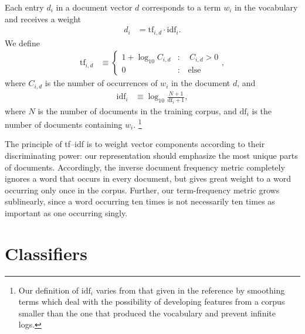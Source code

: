 \documentclass{article}
\begin{document}
Each entry $d_i$ in a document vector $d$ corresponds to a term $w_i$ in the vocabulary and receives a weight
%
\begin{align}
  d_i &= \mathrm{tf}_{i,d} \cdot \mathrm{idf}_{i}.
\end{align}
%
We define
%
\begin{align}
  \mathrm{tf}_{i,d} &\equiv \begin{cases}
                         1 + \log_{10}C_{i,d} &:\quad C_{i,d} > 0\\
                         0 &:\quad\text{else}
                       \end{cases},
\end{align}
%
where $C_{i,d}$ is the number of occurrences of $w_i$ in the document $d$, and
%
\begin{align}
  \mathrm{idf}_i &\equiv \log_{10} \frac{N+1}{\mathrm{df}_i + 1},
\end{align}
%
where $N$ is the number of documents in the training corpus, and $\mathrm{df}_i$ is the number of documents containing $w_i$.
%
\footnote{Our definition of $\mathrm{idf}_i$ varies from that given in the reference by smoothing terms which deal with the possibility of developing features from a corpus smaller than the one that produced the vocabulary and prevent infinite logs.}

The principle of tf--idf is to weight vector components according to their discriminating power: our representation should emphasize the most unique parts of documents.
Accordingly, the inverse document frequency metric completely ignores a word that occurs in every document, but gives great weight to a word occurring only once in the corpus.
Further, our term-frequency metric grows sublinearly, since a word occurring ten times is not necessarily ten times as important as one occurring singly.











\section{Classifiers} \label{sec:classifiers}
\end{document}
